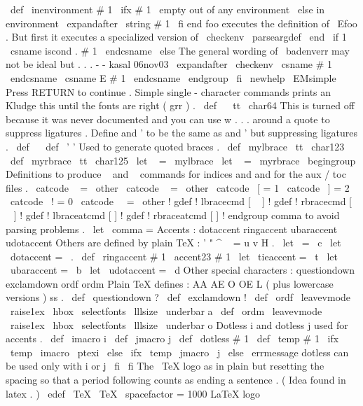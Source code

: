 \
def
\
inenvironment
#
1
{
%
\
ifx
#
1
\
empty
out
of
any
environment
%
\
else
in
environment
\
expandafter
\
string
#
1
%
\
fi
}
%
end
foo
executes
the
definition
of
\
Efoo
.
%
But
first
it
executes
a
specialized
version
of
\
checkenv
%
\
parseargdef
\
end
{
%
\
if
1
\
csname
iscond
.
#
1
\
endcsname
\
else
%
The
general
wording
of
\
badenverr
may
not
be
ideal
but
.
.
.
-
-
kasal
06nov03
\
expandafter
\
checkenv
\
csname
#
1
\
endcsname
\
csname
E
#
1
\
endcsname
\
endgroup
\
fi
}
\
newhelp
\
EMsimple
{
Press
RETURN
to
continue
.
}
%
%
Simple
single
-
character
commands
%
prints
an
%
Kludge
this
until
the
fonts
are
right
(
grr
)
.
\
def
\
{
{
\
tt
\
char64
}
}
%
This
is
turned
off
because
it
was
never
documented
%
and
you
can
use
w
{
.
.
.
}
around
a
quote
to
suppress
ligatures
.
%
%
Define
and
'
to
be
the
same
as
and
'
%
%
but
suppressing
ligatures
.
%
\
def
\
{
{
}
}
%
\
def
\
'
{
{
'
}
}
%
Used
to
generate
quoted
braces
.
\
def
\
mylbrace
{
{
\
tt
\
char123
}
}
\
def
\
myrbrace
{
{
\
tt
\
char125
}
}
\
let
\
{
=
\
mylbrace
\
let
\
}
=
\
myrbrace
\
begingroup
%
Definitions
to
produce
\
{
and
\
}
commands
for
indices
%
and
{
and
}
for
the
aux
/
toc
files
.
\
catcode
\
{
=
\
other
\
catcode
\
}
=
\
other
\
catcode
\
[
=
1
\
catcode
\
]
=
2
\
catcode
\
!
=
0
\
catcode
\
\
=
\
other
!
gdef
!
lbracecmd
[
\
{
]
%
!
gdef
!
rbracecmd
[
\
}
]
%
!
gdef
!
lbraceatcmd
[
{
]
%
!
gdef
!
rbraceatcmd
[
}
]
%
!
endgroup
%
comma
{
}
to
avoid
parsing
problems
.
\
let
\
comma
=
%
Accents
:
dotaccent
ringaccent
ubaraccent
udotaccent
%
Others
are
defined
by
plain
TeX
:
'
"
^
~
=
u
v
H
.
\
let
\
=
\
c
\
let
\
dotaccent
=
\
.
\
def
\
ringaccent
#
1
{
{
\
accent23
#
1
}
}
\
let
\
tieaccent
=
\
t
\
let
\
ubaraccent
=
\
b
\
let
\
udotaccent
=
\
d
%
Other
special
characters
:
questiondown
exclamdown
ordf
ordm
%
Plain
TeX
defines
:
AA
AE
O
OE
L
(
plus
lowercase
versions
)
ss
.
\
def
\
questiondown
{
?
}
\
def
\
exclamdown
{
!
}
\
def
\
ordf
{
\
leavevmode
\
raise1ex
\
hbox
{
\
selectfonts
\
lllsize
\
underbar
{
a
}
}
}
\
def
\
ordm
{
\
leavevmode
\
raise1ex
\
hbox
{
\
selectfonts
\
lllsize
\
underbar
{
o
}
}
}
%
Dotless
i
and
dotless
j
used
for
accents
.
\
def
\
imacro
{
i
}
\
def
\
jmacro
{
j
}
\
def
\
dotless
#
1
{
%
\
def
\
temp
{
#
1
}
%
\
ifx
\
temp
\
imacro
\
ptexi
\
else
\
ifx
\
temp
\
jmacro
\
j
\
else
\
errmessage
{
dotless
can
be
used
only
with
i
or
j
}
%
\
fi
\
fi
}
%
The
\
TeX
{
}
logo
as
in
plain
but
resetting
the
spacing
so
that
a
%
period
following
counts
as
ending
a
sentence
.
(
Idea
found
in
latex
.
)
%
\
edef
\
TeX
{
\
TeX
\
spacefactor
=
1000
}
%
LaTeX
{
}
logo
